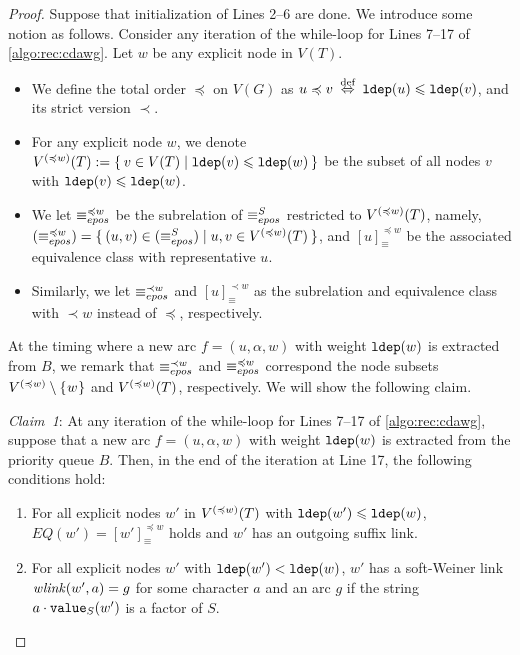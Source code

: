 \documentclass{article}
\begin{document}
\begin{proof}
Suppose that initialization of Lines 2--6 are done. 
We introduce some notion as follows.
Consider any iteration of the while-loop for Lines 7--17 of \cref{algo:rec:cdawg}.
Let $w$ be any explicit node in $V(T)$.
\begin{itemize}
\item We define the total order $\preceq$ on $V(G)$ as $u \preceq v \iffdef \ldep(u) \le \ldep(v)$, and its strict version $\prec$. 
\item For any explicit node $w$, we denote $V\rk{\preceq w}(T) := \sete{ v \in V(T) \mid \ldep(v) \le \ldep(w) }$ be the subset of all nodes $v$ with $\ldep(v) \le \ldep(w)$.
  
\item We let $\eqepos[\preceq w]$ be the subrelation of $\eqepos$ restricted to $V\rk{\preceq w}(T)$, namely, $(\eqepos[\preceq w]) = \sete{ (u,v) \in (\eqepos) \mid u, v \in V\rk{\preceq w}(T)}$, and $[u]^{\preceq w}_{\equiv}$ be the associated equivalence class with representative $u$.

\item Similarly, we let $\eqepos[\prec w]$ and $[u]^{\prec w}_{\equiv}$ as the subrelation and equivalence class with $\prec w$ instead of $\preceq$, respectively. 
\end{itemize}

At the timing where a new arc $f = (u, \alpha, w)$ with weight $\ldep(w)$ is extracted from $B$, we remark that $\eqepos[\prec w]$ and $\eqepos[\preceq w]$ correspond the node subsets $V\rk{\preceq w}\setminus\set{w}$ and $V\rk{\preceq w}(T)$, respectively. We will show the following claim.

\textit{Claim~1}: At any iteration of the while-loop for Lines 7--17 of \cref{algo:rec:cdawg}, suppose that a new arc $f = (u, \alpha, w)$ with weight $\ldep(w)$ is extracted from the priority queue $B$. Then, in the end of the iteration at Line 17, the following conditions hold:  
\begin{enumerate}
  \item For all explicit nodes $w'$ in $V\rk{\preceq w}(T)$ with $\ldep(w') \le \ldep(w)$, $EQ(w') = [w']^{\preceq w}_{\equiv}$ holds and $w'$ has an outgoing suffix link.
  \item For all explicit nodes $w'$ with $\ldep(w') < \ldep(w)$, $w'$ has a soft-Weiner link $\wlink(w', a) = g$ for some character $a$ and an arc $g$ if the string $a\cdot\Value(w')$ is a factor of $S$. 
\end{enumerate}



\end{proof}
\end{document}
